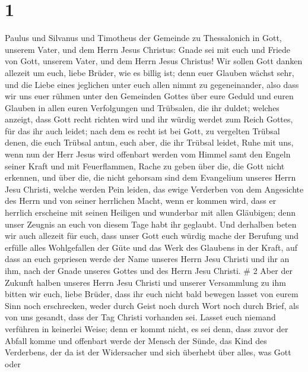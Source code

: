 \hypertarget{section}{%
\section{1}\label{section}}

 Paulus und Silvanus und Timotheus der Gemeinde zu
Thessalonich in Gott, unserem Vater, und dem Herrn Jesus Christus:
 Gnade sei mit euch und Friede von Gott, unserem Vater, und
dem Herrn Jesus Christus!  Wir sollen Gott danken allezeit
um euch, liebe Brüder, wie es billig ist; denn euer Glauben wächst sehr,
und die Liebe eines jeglichen unter euch allen nimmt zu gegeneinander,
 also dass wir uns euer rühmen unter den Gemeinden Gottes
über eure Geduld und euren Glauben in allen euren Verfolgungen und
Trübsalen, die ihr duldet;  welches anzeigt, dass Gott recht
richten wird und ihr würdig werdet zum Reich Gottes, für das ihr auch
leidet;  nach dem es recht ist bei Gott, zu vergelten
Trübsal denen, die euch Trübsal antun,  euch aber, die ihr
Trübsal leidet, Ruhe mit uns, wenn nun der Herr Jesus wird offenbart
werden vom Himmel samt den Engeln seiner Kraft  und mit
Feuerflammen, Rache zu geben über die, die Gott nicht erkennen, und über
die, die nicht gehorsam sind dem Evangelium unseres Herrn Jesu Christi,
 welche werden Pein leiden, das ewige Verderben von dem
Angesichte des Herrn und von seiner herrlichen Macht,  wenn
er kommen wird, dass er herrlich erscheine mit seinen Heiligen und
wunderbar mit allen Gläubigen; denn unser Zeugnis an euch von diesem
Tage habt ihr geglaubt.  Und derhalben beten wir auch
allezeit für euch, dass unser Gott euch würdig mache der Berufung und
erfülle alles Wohlgefallen der Güte und das Werk des Glaubens in der
Kraft,  auf dass an euch gepriesen werde der Name unseres
Herrn Jesu Christi und ihr an ihm, nach der Gnade unseres Gottes und des
Herrn Jesu Christi. \# 2  Aber der Zukunft halben unseres
Herrn Jesu Christi und unserer Versammlung zu ihm bitten wir euch, liebe
Brüder,  dass ihr euch nicht bald bewegen lasset von eurem
Sinn noch erschrecken, weder durch Geist noch durch Wort noch durch
Brief, als von uns gesandt, dass der Tag Christi vorhanden sei.
 Lasset euch niemand verführen in keinerlei Weise; denn er
kommt nicht, es sei denn, dass zuvor der Abfall komme und offenbart
werde der Mensch der Sünde, das Kind des Verderbens,  der da
ist der Widersacher und sich überhebt über alles, was Gott oder
